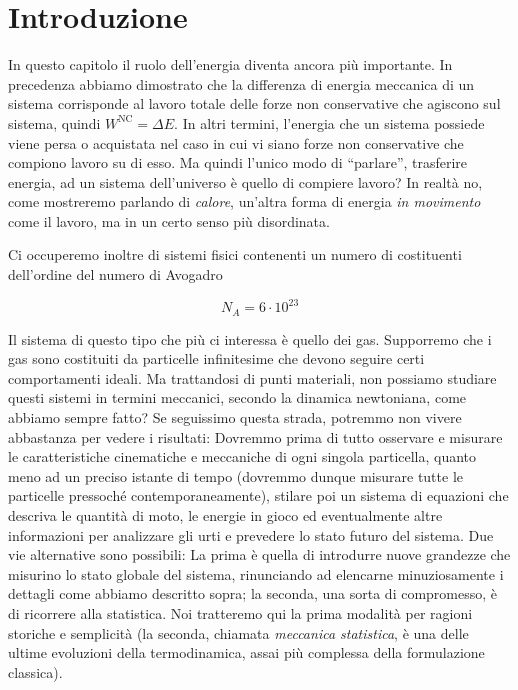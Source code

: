 \marginpar{\minitoc}

\section{Introduzione}
In questo capitolo il ruolo dell'energia diventa ancora più
importante. In precedenza abbiamo dimostrato che la differenza di
energia meccanica di un sistema corrisponde al lavoro totale delle
forze non conservative che agiscono sul sistema, quindi $W^\text{NC} = \Delta E$.
In altri termini, l'energia che un sistema possiede viene persa o
acquistata nel caso in cui vi siano forze non conservative che
compiono lavoro su di esso. Ma quindi l'unico modo di ``parlare'',
trasferire energia, ad un sistema dell'universo è quello di compiere
lavoro? In realtà no, come mostreremo parlando di \textit{calore},
un'altra forma di energia \textit{in movimento} come il lavoro, ma
in un certo senso più disordinata.

Ci occuperemo inoltre di sistemi fisici contenenti un numero di
costituenti dell'ordine del numero di Avogadro

\[ N_A = 6 \cdot 10^{23} \]

\noindent Il sistema di questo tipo che più ci interessa è quello
dei gas. Supporremo che i gas sono costituiti da particelle
infinitesime che devono seguire certi comportamenti ideali. Ma
trattandosi di punti materiali, non possiamo studiare questi
sistemi in termini meccanici, secondo la dinamica newtoniana,
come abbiamo sempre fatto? Se seguissimo questa strada, potremmo
non vivere abbastanza per vedere i risultati: Dovremmo prima di
tutto osservare e misurare le caratteristiche cinematiche e
meccaniche di ogni singola particella, quanto meno ad un preciso istante di
tempo (dovremmo dunque misurare tutte le particelle pressoché
contemporaneamente), stilare poi un sistema di equazioni che
descriva le quantità di moto, le energie in gioco ed eventualmente
altre informazioni per analizzare gli urti e prevedere lo stato
futuro del sistema. Due vie alternative sono possibili: La prima è
quella di introdurre nuove grandezze che misurino lo stato globale
del sistema, rinunciando ad elencarne minuziosamente i dettagli come
abbiamo descritto sopra; la seconda, una sorta di compromesso,
è di ricorrere alla statistica. Noi tratteremo qui la prima modalità
per ragioni storiche e semplicità (la seconda, chiamata \textit{meccanica statistica},
è una delle ultime evoluzioni della termodinamica, assai più
complessa della formulazione classica).

